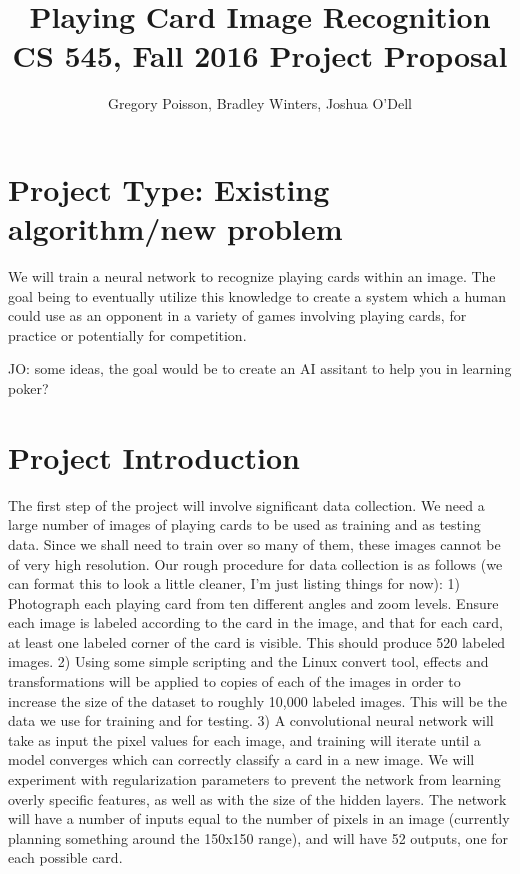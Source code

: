 \documentclass{article}
\begin{document}
\title{ Playing Card Image Recognition\\[1ex] \footnotesize\mdseries CS 545, Fall 2016 Project Proposal }
\author{Gregory Poisson, Bradley Winters, Joshua O'Dell}
\maketitle

\noindent\hrulefill
\vspace{-5mm} %

\section{Project Type:  Existing algorithm/new problem}
We will train a neural network to recognize playing cards within an image.  The goal being to eventually utilize this knowledge to create a system which a human could use as an opponent in a variety of games involving playing cards, for practice or potentially for competition.

JO: some ideas, the goal would be to create an AI assitant to help you in learning poker?

\section{Project Introduction}
The first step of the project will involve significant data collection. We need a large number of images of playing cards to be used as training and as testing data. Since we shall need to train over so many of them, these images cannot be of very high resolution. Our rough procedure for data collection is as follows (we can format this to look a little cleaner, I'm just listing things for now): 1) Photograph each playing card from ten different angles and zoom levels. Ensure each image is labeled according to the card in the image, and that for each card, at least one labeled corner of the card is visible. This should produce 520 labeled images. 2) Using some simple scripting and the Linux convert tool, effects and transformations will be applied to copies of each of the images in order to increase the size of the dataset to roughly 10,000 labeled images. This will be the data we use for training and for testing. 3) A convolutional neural network \cite{conv} will take as input the pixel values for each image, and training will iterate until a model converges which can correctly classify a card in a new image. We will experiment with regularization parameters to prevent the network from learning overly specific features, as well as with the size of the hidden layers. The network will have a number of inputs equal to the number of pixels in an image (currently planning something around the 150x150 range), and will have 52 outputs, one for each possible card.
\end{document}
